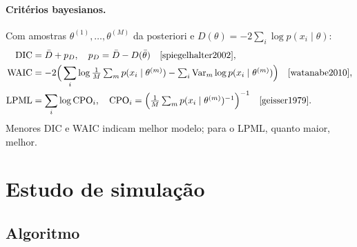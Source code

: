 \documentclass[11pt,a4paper]{article}
\newcommand{\Var}{\mathrm{Var}}
\begin{document}
\paragraph{Critérios bayesianos.} Com amostras $\theta^{(1)},\dots,\theta^{(M)}$ da posteriori e $D(\theta)=-2\sum_i\log p(x_i\mid\theta)$:
\begin{align*}
\text{DIC}&=\bar D+p_D,\quad p_D=\bar D-D(\bar\theta) \quad\text{\cite{spiegelhalter2002}},\\
\text{WAIC}&=-2\Big(\sum_i\log\tfrac1M\textstyle\sum_mp(x_i\mid\theta^{(m)})-\sum_i\Var_m\log p(x_i\mid\theta^{(m)})\Big)\quad\text{\cite{watanabe2010}},\\
\text{LPML}&=\sum_i\log\text{CPO}_i,\quad\text{CPO}_i=\Big(\tfrac1M\textstyle\sum_m p(x_i\mid\theta^{(m)})^{-1}\Big)^{-1}\quad\text{\cite{geisser1979}}.
\end{align*}
Menores DIC e WAIC indicam melhor modelo; para o LPML, quanto maior, melhor.

\section{Estudo de simulação}

\subsection{Algoritmo}
\end{document}
